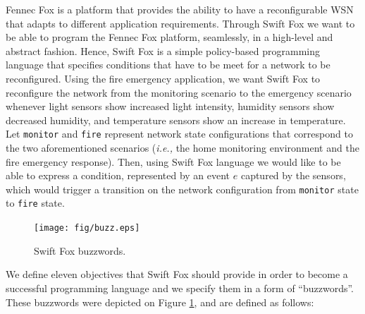 Fennec Fox is a platform that provides the ability to have a reconfigurable
WSN that adapts to different application requirements. Through Swift Fox
we want to be able to program the Fennec Fox platform, seamlessly, in a
high-level and abstract fashion. Hence, Swift Fox is a simple policy-based 
programming language that specifies conditions that have to be meet for a
network to be reconfigured. Using the fire emergency application, we want
Swift Fox to reconfigure the network from the monitoring scenario to the
emergency scenario whenever light sensors show increased light intensity,
humidity sensors show decreased humidity, and temperature sensors show an
increase in temperature. Let \texttt{monitor} and \texttt{fire} represent
network state configurations that correspond to the two aforementioned
scenarios (\textit{i.e.,} the home monitoring environment and the fire
emergency response). Then, using Swift Fox language we would like to be
able to express a condition, represented by an event $e$ captured by
the sensors, which would trigger a transition on the network configuration 
from \texttt{monitor} state to \texttt{fire} state. 

\begin{figure}[htp]
\centering
        \texttt{[image: fig/buzz.eps]}
        \caption{Swift Fox buzzwords.}
        \label{fig:buzz}
\end{figure}

We define eleven objectives that Swift Fox should provide in order to
become a successful programming language and we specify them in a form of
``buzzwords''. These buzzwords were depicted on Figure \ref{fig:buzz}, and
are defined as follows:


